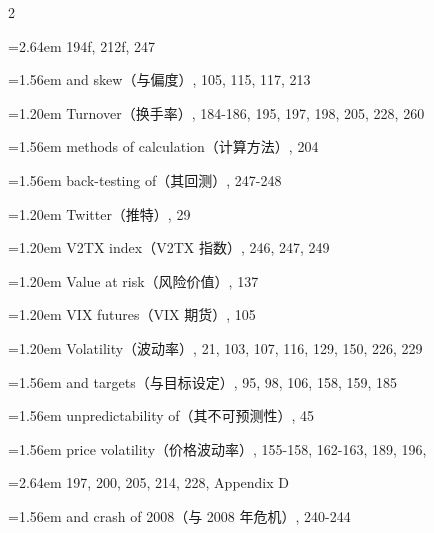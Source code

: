 {\begin{multicols}{2}
\par \noindent\hangindent=2.64em\hspace*{1.44em} 194f, 212f, 247
\par \noindent\hangindent=1.56em\hspace*{0.36em} and skew（与偏度）, 105, 115, 117, 213
\par \noindent\hangindent=1.20em\hspace*{0.00em} Turnover（换手率）, 184-186, 195, 197, 198, 205, 228, 260
\par \noindent\hangindent=1.56em\hspace*{0.36em} methods of calculation（计算方法）, 204
\par \noindent\hangindent=1.56em\hspace*{0.36em} back-testing of（其回测）, 247-248
\par \noindent\hangindent=1.20em\hspace*{0.00em} Twitter（推特）, 29
\par \noindent\hangindent=1.20em\hspace*{0.00em} V2TX index（V2TX 指数）, 246, 247, 249
\par \noindent\hangindent=1.20em\hspace*{0.00em} Value at risk（风险价值）, 137
\par \noindent\hangindent=1.20em\hspace*{0.00em} VIX futures（VIX 期货）, 105
\par \noindent\hangindent=1.20em\hspace*{0.00em} Volatility（波动率）, 21, 103, 107, 116, 129, 150, 226, 229
\par \noindent\hangindent=1.56em\hspace*{0.36em} and targets（与目标设定）, 95, 98, 106, 158, 159, 185
\par \noindent\hangindent=1.56em\hspace*{0.36em} unpredictability of（其不可预测性）, 45
\par \noindent\hangindent=1.56em\hspace*{0.36em} price volatility（价格波动率）, 155-158, 162-163, 189, 196,
\par \noindent\hangindent=2.64em\hspace*{1.44em} 197, 200, 205, 214, 228, Appendix D
\par \noindent\hangindent=1.56em\hspace*{0.36em} and crash of 2008（与 2008 年危机）, 240-244

\end{multicols}}
